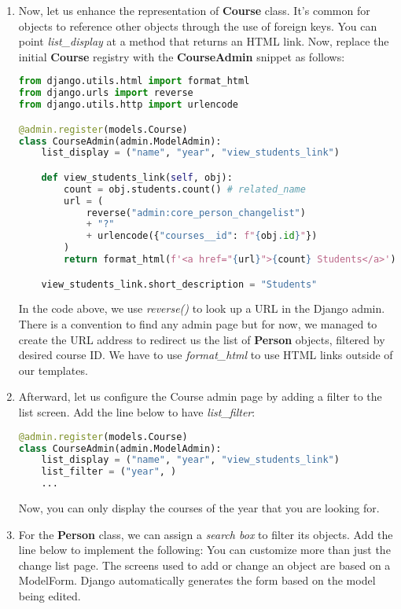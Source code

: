 \documentclass{homework}
\begin{document}
\begin{enumerate}[label=\roman*)]
    \item Now, let us enhance the representation of \textbf{Course} class. It’s common for objects to reference other objects through the use of foreign keys. You can point \textit{list\_display} at a method that returns an HTML link. Now, replace the initial \textbf{Course} registry with the \textbf{CourseAdmin} snippet as follows:
    \begin{lstlisting}[language=python]
from django.utils.html import format_html
from django.urls import reverse
from django.utils.http import urlencode

@admin.register(models.Course)
class CourseAdmin(admin.ModelAdmin):
    list_display = ("name", "year", "view_students_link")

    def view_students_link(self, obj):
        count = obj.students.count() # related_name
        url = (
            reverse("admin:core_person_changelist")
            + "?"
            + urlencode({"courses__id": f"{obj.id}"})
        )
        return format_html(f'<a href="{url}">{count} Students</a>')

    view_students_link.short_description = "Students"
\end{lstlisting}
    In the code above, we use \textit{reverse()} to look up a URL in the Django admin. There is a convention to find any admin page but for now, we managed to create the URL address to redirect us the list of \textbf{Person} objects, filtered by desired course ID. We have to use \textit{format\_html} to use HTML links outside of our templates. 

    \item Afterward, let us configure the Course admin page by adding a filter to the list screen. Add the line below to have \textit{list\_filter}:
    \begin{lstlisting}[language=python]
@admin.register(models.Course)
class CourseAdmin(admin.ModelAdmin):
    list_display = ("name", "year", "view_students_link")
    list_filter = ("year", )
    ...
\end{lstlisting}
    Now, you can only display the courses of the year that you are looking for.
    
    \item For the \textbf{Person} class, we can assign a \textit{search box} to filter its objects. Add the line below to implement the following:
    You can customize more than just the change list page. The screens used to add or change an object are based on a ModelForm. Django automatically generates the form based on the model being edited.


\end{enumerate}
\end{document}
